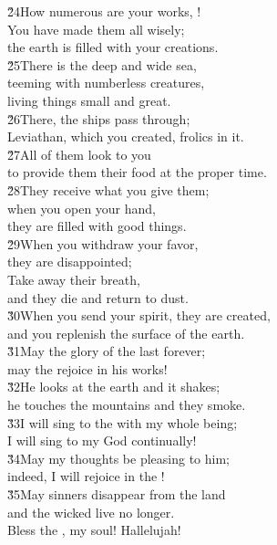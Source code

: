 \begin{poetry}
\poeml \v{24}How numerous are your works, ! \\
\poemll    You have made them all wisely; \\
\poemlll       the earth is filled with your creations. \\
\poeml \v{25}There is the deep and wide sea, \\
\poemll    teeming with numberless creatures, \\
\poemlll       living things small and great. \\
\poeml \v{26}There, the ships pass through; \\
\poemll    Leviathan, which you created, frolics in it. \\
\poeml \v{27}All of them look to you \\
\poemll    to provide them their food at the proper time. \\
\poeml \v{28}They receive what you give them; \\
\poemll    when you open your hand, \\
\poemlll       they are filled with good things. \\
\poeml \v{29}When you withdraw your favor, \\
\poemll    they are disappointed; \\
\poeml Take away their breath, \\
\poemll    and they die and return to dust. \\
\poeml \v{30}When you send your spirit, they are created, \\
\poemll    and you replenish the surface of the earth. \\
\poeml \v{31}May the glory of the  last forever; \\
\poemll    may the  rejoice in his works! \\
\poeml \v{32}He looks at the earth and it shakes; \\
\poemll    he touches the mountains and they smoke. \\
\poeml \v{33}I will sing to the  with my whole being; \\
\poemll    I will sing to my God continually! \\
\poeml \v{34}May my thoughts be pleasing to him; \\
\poemll    indeed, I will rejoice in the ! \\
\poeml \v{35}May sinners disappear from the land \\
\poemll    and the wicked live no longer. \\
\poeml Bless the , my soul! Hallelujah!
\end{poetry}
